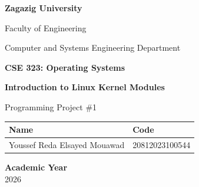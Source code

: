 \documentclass[11pt,a4paper]{article}
\newcommand{\ProjectTitle}{Introduction to Linux Kernel Modules}
\newcommand{\CourseName}{CSE 323: Operating Systems}
\newcommand{\UniversityName}{Zagazig University}
\newcommand{\FacultyName}{Faculty of Engineering}
\newcommand{\DepartmentName}{Computer and Systems Engineering Department}
\newcommand{\AcademicYear}{2026}
\begin{document}
\begin{titlepage}
    \thispagestyle{empty}
    \centering

    \vspace*{1.2cm}

    {\Large\bfseries\color{primary}\UniversityName\par}
    \vspace{0.25cm}
    {\large\FacultyName\par}
    {\large\DepartmentName\par}

    \vspace{1.4cm}

    {\Large\bfseries\color{secondary}\CourseName\par}
    \vspace{0.8cm}

    {\Huge\bfseries\color{primary}\ProjectTitle\par}

    \vspace{0.6cm}
    {\large Programming Project \#1\par}

    \vspace{2cm}

    \begin{center}
        \renewcommand{\arraystretch}{1.5}
        \begin{tabular}{|p{6.5cm}|p{3.5cm}|}
            \hline
            \textbf{Name}                & \textbf{Code}  \\
            \hline
            Youssef Reda Elsayed Mouawad & 20812023100544 \\
            \hline
        \end{tabular}
    \end{center}

    \vfill

    \begin{flushleft}
        \centering
        \textbf{Academic Year}\\
        \vspace{0.4cm}
        \AcademicYear
    \end{flushleft}
\end{titlepage}

\tableofcontents
\clearpage
{}
\end{document}
